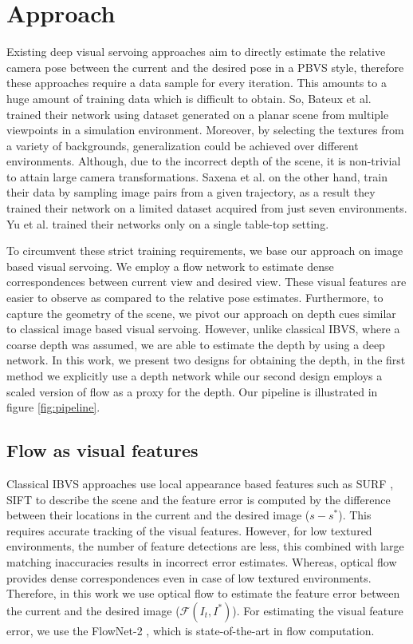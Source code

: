 \documentclass[letterpaper, 10 pt, conference]{ieeeconf}  %
\begin{document}
\section{Approach}
Existing deep visual servoing approaches aim to directly estimate the relative camera pose between the current and the desired pose in a PBVS style, therefore these approaches require a data sample for every iteration. This amounts to a huge amount of training data which is difficult to obtain. So, Bateux et al. \cite{trainingdeepvs} trained their network using dataset generated on a planar scene from multiple viewpoints in a simulation environment. Moreover, by selecting the textures from a variety of backgrounds, generalization could be achieved over different environments. Although, due to the incorrect depth of the scene, it is non-trivial to attain large camera transformations. Saxena et al. \cite{servonet} on the other hand, train their data by sampling image pairs from a given trajectory, as a result they trained their network on a limited dataset acquired from just seven environments. Yu et al. \cite{siamesevs} trained their networks only on a single table-top setting.

\indent To circumvent these strict training requirements, we base our approach on image based visual servoing. We employ a flow network \cite{flownet2} to estimate dense correspondences between current view and desired view. These visual features are easier to observe as compared to the relative pose estimates. Furthermore, to capture the geometry of the scene, we pivot our approach on depth cues similar to classical image based visual servoing. However, unlike classical IBVS, where a coarse depth was assumed, we are able to estimate the depth by using a deep network. In this work, we present two designs for obtaining the depth, in the first method we explicitly use a depth network \cite{depthnet} while our second design employs a scaled version of flow as a proxy for the depth. Our pipeline is illustrated in figure \ref{fig:pipeline}.

\subsection{Flow as visual features}
Classical IBVS approaches use local appearance based features such as SURF \cite{surf}, SIFT \cite{sift} to describe the scene and the feature error is computed by the difference between their locations in the current and the desired image ($s-s^*$). This requires accurate tracking of the visual features. However, for low textured environments, the number of feature detections are less, this combined with large matching inaccuracies results in incorrect error estimates. Whereas, optical flow provides dense correspondences even in case of low textured environments. Therefore, in this work we use optical flow to estimate the feature error between the current and the desired image ($\mathcal{F}(I_t,I^*)$). For estimating the visual feature error, we use the FlowNet-2 \cite{flownet2}, which is state-of-the-art in flow computation.
\end{document}
